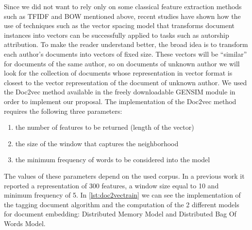 Since we did not want to rely only on some classical feature extraction methods such as TFIDF and BOW mentioned above, recent studies have shown how the use of techniques such as the vector spacing model that transforms document instances into vectors can be successfully applied to tasks such as autorship attribution. To make the reader understand better, the broad idea is to transform each author's documents into vectors of fixed size. These vectors will be \enquote{similar} for documents of the same author, so on documents of unknown author we will look for the collection of documents whose representation in vector format is closest to the vector representation of the document of unknown author.
We used the Doc2vec \cite{le2014distributed} method available in the freely downloadable GENSIM module in order to implement our proposal. The implementation of the Doc2vec method requires the following three parameters:
\begin{enumerate}
	\item the number of features to be returned (length of the vector)
	\item the size of the window that captures the neighborhood
	\item the minimum frequency of words to be considered into the model
\end{enumerate}

The values of these parameters depend on the used corpus. In a previous work \cite{posadas2017application} it reported a representation of 300 features, a window size equal to 10
and minimum frequency of 5. In \autoref{lst:doc2vectrain} we can see the implementation of the tagging document algorithm and the computation of the 2 different models for document embedding: Distributed Memory Model and Distributed Bag Of Words Model.

